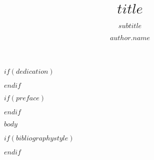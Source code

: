 \documentclass[openany,ngerman]{book}
\author{$author.name$}
\title{$title$}
\subtitle{$subtitle$}
\begin{document}
\frontmatter
\maketitle

$if(dedication)$
\dedication{$dedication$}
$endif$

$if(preface)$

$endif$

$body$

%

\backmatter

$if(bibliographystyle)$

$endif$

\printbibliography[env=bibnumeric]
\end{document}

